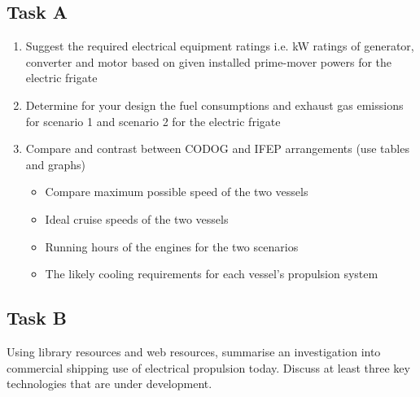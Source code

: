 \subsection{Task A}
\begin{enumerate}
    \item Suggest the required electrical equipment ratings i.e. \si{\kilo\watt} ratings of generator, converter and motor based on given installed prime-mover powers for the electric frigate
    \item Determine for your design the fuel consumptions and exhaust gas emissions for scenario 1 and scenario 2 for the electric frigate
    \item Compare and contrast between CODOG and IFEP arrangements (use tables and graphs)
          \begin{itemize}
              \item Compare maximum possible speed of the two vessels
              \item Ideal cruise speeds of the two vessels
              \item Running hours of the engines for the two scenarios
              \item The likely cooling requirements for each vessel's propulsion system
          \end{itemize}
\end{enumerate}
\subsection{Task B}
Using library resources and web resources, summarise an investigation into commercial shipping use of electrical propulsion today. Discuss at least three key technologies that are under development.